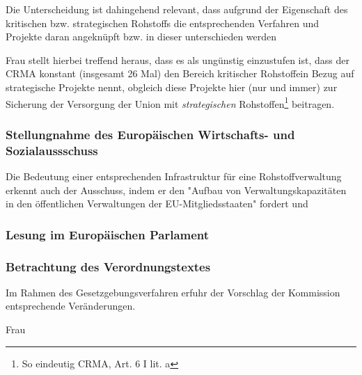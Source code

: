 \documentclass[12pt,a4paper,oneside]{book} %
\begin{document}
	
	Die Unterscheidung ist dahingehend relevant, dass aufgrund der Eigenschaft des kritischen bzw. strategischen Rohstoffs die entsprechenden Verfahren und Projekte daran angeknüpft bzw. in dieser unterschieden werden
	
	Frau\autocite{Frau 2024, NVwZ 2024, 1874, 1875} stellt hierbei treffend heraus, dass es als ungünstig einzustufen ist, dass der CRMA konstant (insgesamt 26 Mal) den \glqq Bereich kritischer Rohstoffe\grqq in Bezug auf strategische Projekte nennt, obgleich diese Projekte hier (nur und immer) zur \glqq Sicherung der Versorgung der Union mit \textit{strategischen} Rohstoffen\grqq\footnote{So eindeutig CRMA, Art. 6 I lit. a} beitragen. 
	
	\subsubsection{Stellungnahme des Europäischen Wirtschafts- und Sozialaussschuss}
	
	Die Bedeutung einer entsprechenden Infrastruktur für eine Rohstoffverwaltung erkennt auch der Ausschuss, indem er den "Aufbau von Verwaltungskapazitäten in den öffentlichen Verwaltungen der EU-Mitgliedsstaaten" fordert %
	und 
	
	\subsubsection{Lesung im Europäischen Parlament}
	
	
	\subsubsection{Betrachtung des Verordnungstextes}
	Im Rahmen des Gesetzgebungsverfahren erfuhr der Vorschlag der Kommission entsprechende Veränderungen.
	
	Frau\autocite{Frau, NVwZ 2024, 1874}
	
	
\end{document}

